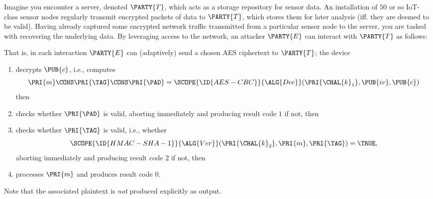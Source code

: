 %



Imagine you encounter a server, denoted $\PARTY{T}$, 
which acts as a storage repository for sensor data.  An installation of $50$ 
or so IoT-class sensor nodes regularly transmit encrypted packets of data to
$\PARTY{T}$, which stores them for later analysis (iff. they are deemed to be
valid).  Having already captured some encrypted network traffic transmitted 
from a particular sensor node to the server, you are tasked with recovering 
the underlying data.
By leveraging access to the network, 
an attacker $\PARTY{E}$ can interact with $\PARTY{T}$ as follows:

\begin{center}

\end{center}

\noindent
That is, in each interaction $\PARTY{E}$ can (adaptively) send 
a chosen AES ciphertext
to $\PARTY{T}$; the device

\begin{enumerate}
\item decrypts $\PUB{c}$, i.e., computes
      \[
      \PRI{m} \CONS \PRI{\TAG} \CONS \PRI{\PAD} = \SCOPE{\ID{AES-CBC}}{\ALG{Dec}}( \PRI{\CHAL{k}_1}, \PUB{iv}, \PUB{c} )
      \]
      then
\item checks whether $\PRI{\PAD}$ is valid, 
      aborting immediately  and producing result code $1$ if not,
      then
\item checks whether $\PRI{\TAG}$ is valid, i.e., whether 
      \[
      \SCOPE{\ID{HMAC-SHA-1}}{\ALG{Ver}}( \PRI{\CHAL{k}_2}, \PRI{m}, \PRI{\TAG} ) = \TRUE ,
      \]
      aborting immediately  and producing result code $2$ if not,
      then
\item processes $\PRI{m}$
                            and produces  result code $0$.
\end{enumerate}

\noindent
Note that the associated  plaintext is {\em not} produced explicitly as
output.


